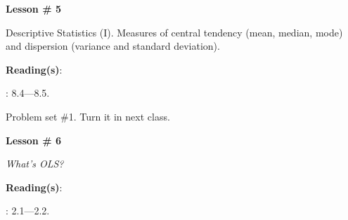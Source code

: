 \documentclass[letterpaper]{article}
\renewenvironment{itemize}{
  \begin{list}{}{
    \setlength{\leftmargin}{1.5em}
  }
}{
  \end{list}
}
\begin{document}
\begin{enumerate}
	\item {}

			\begin{itemize} 
				\item[$\bullet$] {\bf Lesson \# 5} %
					\begin{itemize} 
				\item[$\circ$] Descriptive Statistics (I). Measures of central tendency (mean, median, mode) and dispersion (variance and standard deviation). %
          \item[$\circ$] {\bf Reading(s)}: 
          \begin{itemize}
            \item[$\diamond$] \textcite{Gill:2006wp}: 8.4---8.5.
          \end{itemize}
					\end{itemize}
			\end{itemize}




\item[{\color{red}\Pointinghand}] Problem set \#1. Turn it in next class.


	\item {}


			\begin{itemize} 
				\item[$\bullet$] {\bf Lesson \# 6} %
					\begin{itemize} 
						\item[$\circ$] \emph{What's OLS?}
						\item[$\circ$] {\bf Reading(s)}: 
							\begin{itemize}
								\item[$\diamond$] \textcite{Wooldridge2002}: 2.1---2.2.
							\end{itemize}
					\end{itemize}
			\end{itemize}




\end{enumerate}
\end{document}
